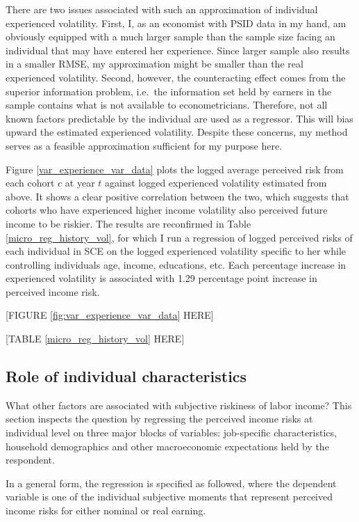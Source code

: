 \documentclass[12pt,notitlepage,onecolumn,aps,pra]{article}
\begin{document}
There are two issues associated with such an approximation of individual
experienced volatility. First, I, as an economist with PSID data in my
hand, am obviously equipped with a much larger sample than the sample
size facing an individual that may have entered her experience. Since
larger sample also results in a smaller RMSE, my approximation might be
smaller than the real experienced volatility. Second, however, the
counteracting effect comes from the superior information problem,
i.e.~the information set held by earners in the sample contains what is
not available to econometricians. Therefore, not all known factors
predictable by the individual are used as a regressor. This will bias
upward the estimated experienced volatility. Despite these concerns, my
method serves as a feasible approximation sufficient for my purpose
here.

Figure \ref{var_experience_var_data} plots the logged average perceived
risk from each cohort \(c\) at year \(t\) against logged experienced
volatility estimated from above. It shows a clear positive correlation
between the two, which suggests that cohorts who have experienced higher
income volatility also perceived future income to be riskier. The
results are reconfirmed in Table \ref{micro_reg_history_vol}, for which
I run a regression of logged perceived risks of each individual in SCE
on the logged experienced volatility specific to her while controlling
individuals age, income, educations, etc. Each percentage increase in
experienced volatility is associated with 1.29 percentage point increase
in perceived income risk.

{[}FIGURE \ref{fig:var_experience_var_data} HERE{]}

{[}TABLE \ref{micro_reg_history_vol} HERE{]}



    \hypertarget{role-of-individual-characteristics}{%
\subsection{Role of individual
characteristics}\label{role-of-individual-characteristics}}

What other factors are associated with subjective riskiness of labor
income? This section inspects the question by regressing the perceived
income risks at individual level on three major blocks of variables:
job-specific characteristics, household demographics and other
macroeconomic expectations held by the respondent.

In a general form, the regression is specified as followed, where the
dependent variable is one of the individual subjective moments that
represent perceived income risks for either nominal or real earning.
\end{document}
